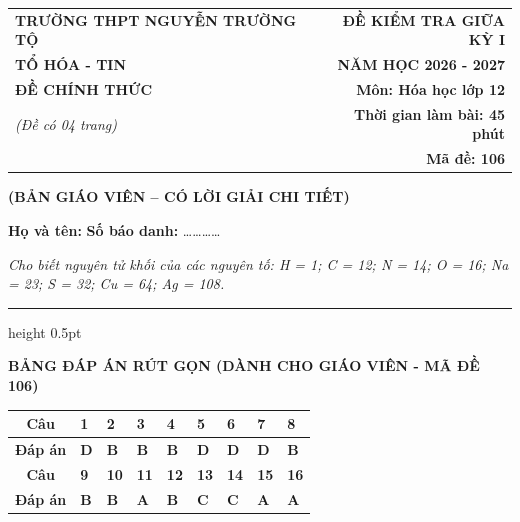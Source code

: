 \documentclass[11pt,a4paper]{article}
\begin{document}
\noindent
\begin{tabularx}{\textwidth}{@{}X r@{}}
\textbf{TRƯỜNG THPT NGUYỄN TRƯỜNG TỘ} & \textbf{ĐỀ KIỂM TRA GIỮA KỲ I} \\
\textbf{TỔ HÓA - TIN} & \textbf{NĂM HỌC 2026 - 2027} \\
\textbf{ĐỀ CHÍNH THỨC} & \textbf{Môn: Hóa học lớp 12} \\
\textit{(Đề có 04 trang)} & \textbf{Thời gian làm bài: 45 phút} \\
& \textbf{Mã đề: 106}
\end{tabularx}

\begin{center}
{\color{hfRed}\textbf{\large (BẢN GIÁO VIÊN -- CÓ LỜI GIẢI CHI TIẾT)}}
\end{center}

\vspace{2pt}
\noindent\textbf{Họ và tên:} \dotfill \textbf{Số báo danh:} \dots\dots\dots\dots

\vspace{2pt}
\noindent\textit{Cho biết nguyên tử khối của các nguyên tố: H = 1; C = 12; N = 14; O = 16; Na = 23; S = 32; Cu = 64; Ag = 108.}
\vspace{2pt}
\hrule height 0.5pt
\vspace{6pt}

\begin{center}
{\color{hfRed}\textbf{\large BẢNG ĐÁP ÁN RÚT GỌN (DÀNH CHO GIÁO VIÊN - MÃ ĐỀ 106)}}
\end{center}

\begin{center}
\renewcommand{\arraystretch}{1.2}
\begin{tabular}{|c|*{8}{>{\centering\arraybackslash}m{0.95cm}|}}
\hline
\rowcolor{tableGreen}
\textbf{Câu} & \textbf{1} & \textbf{2} & \textbf{3} & \textbf{4} & \textbf{5} & \textbf{6} & \textbf{7} & \textbf{8} \\
\hline
\textbf{Đáp án} & \textbf{\color{hfRed}D} & \textbf{\color{hfRed}B} & \textbf{\color{hfRed}B} & \textbf{\color{hfRed}B} & \textbf{\color{hfRed}D} & \textbf{\color{hfRed}D} & \textbf{\color{hfRed}D} & \textbf{\color{hfRed}B} \\
\hline
\hline
\rowcolor{tableGreen}
\textbf{Câu} & \textbf{9} & \textbf{10} & \textbf{11} & \textbf{12} & \textbf{13} & \textbf{14} & \textbf{15} & \textbf{16} \\
\hline
\textbf{Đáp án} & \textbf{\color{hfRed}B} & \textbf{\color{hfRed}B} & \textbf{\color{hfRed}A} & \textbf{\color{hfRed}B} & \textbf{\color{hfRed}C} & \textbf{\color{hfRed}C} & \textbf{\color{hfRed}A} & \textbf{\color{hfRed}A} \\
\hline
\end{tabular}
\end{center}
\end{document}
